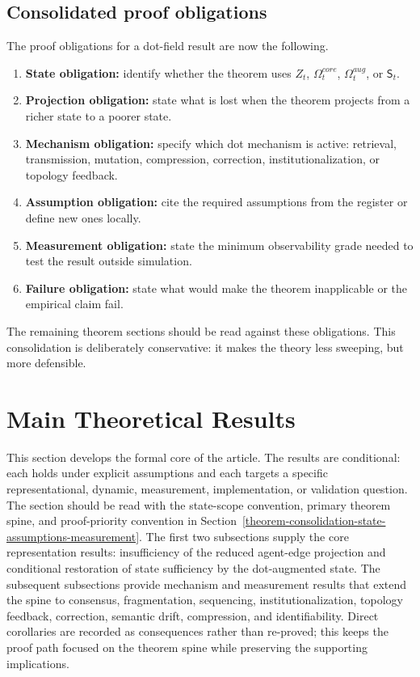 \documentclass[11pt]{article}
\theoremstyle{remark}
\begin{document}
\subsection{Consolidated proof obligations}\label{consolidated-proof-obligations}

The proof obligations for a dot-field result are now the following.

\begin{enumerate}[leftmargin=*]
\item \textbf{State obligation:} identify whether the theorem uses $Z_t$, $\Omega_t^{core}$, $\Omega_t^{aug}$, or $\mathsf S_t$.
\item \textbf{Projection obligation:} state what is lost when the theorem projects from a richer state to a poorer state.
\item \textbf{Mechanism obligation:} specify which dot mechanism is active: retrieval, transmission, mutation, compression, correction, institutionalization, or topology feedback.
\item \textbf{Assumption obligation:} cite the required assumptions from the register or define new ones locally.
\item \textbf{Measurement obligation:} state the minimum observability grade needed to test the result outside simulation.
\item \textbf{Failure obligation:} state what would make the theorem inapplicable or the empirical claim fail.
\end{enumerate}

The remaining theorem sections should be read against these obligations. This consolidation is deliberately conservative: it makes the theory less sweeping, but more defensible.

\section{Main Theoretical Results}\label{theoretical-results}

This section develops the formal core of the article. The results are conditional: each holds under explicit assumptions and each targets a specific representational, dynamic, measurement, implementation, or validation question. The section should be read with the state-scope convention, primary theorem spine, and proof-priority convention in Section~\ref{theorem-consolidation-state-assumptions-measurement}. The first two subsections supply the core representation results: insufficiency of the reduced agent-edge projection and conditional restoration of state sufficiency by the dot-augmented state. The subsequent subsections provide mechanism and measurement results that extend the spine to consensus, fragmentation, sequencing, institutionalization, topology feedback, correction, semantic drift, compression, and identifiability. Direct corollaries are recorded as consequences rather than re-proved; this keeps the proof path focused on the theorem spine while preserving the supporting implications.
\end{document}
